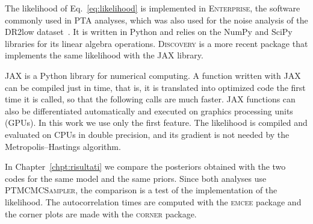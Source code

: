 The likelihood of Eq.~\eqref{eq:likelihood} is implemented in
\textsc{Enterprise}, the software commonly used in PTA analyses, which was
also used for the noise analysis of the DR2low dataset~\cite{Iraci2025}. It is written in
Python and relies on the NumPy and SciPy libraries for its linear algebra
operations. \textsc{Discovery} is a more recent package that implements the
same likelihood with the JAX library.

JAX is a Python library for numerical computing. A function written with JAX
can be compiled just in time, that is, it is translated into optimized code the
first time it is called, so that the following calls are much faster. JAX
functions can also be differentiated automatically and executed on graphics
processing units (GPUs). In this work we use only the first feature. The
likelihood is compiled and evaluated on CPUs in double precision, and its
gradient is not needed by the Metropolis--Hastings algorithm.

In Chapter~\ref{chpt:risultati} we compare the posteriors obtained with the
two codes for the same model and the same priors. Since both analyses use
\textsc{PTMCMCSampler}, the comparison is a test of the implementation of the
likelihood. The autocorrelation times are computed with the \textsc{emcee}
package and the corner plots are made with the \textsc{corner} package.